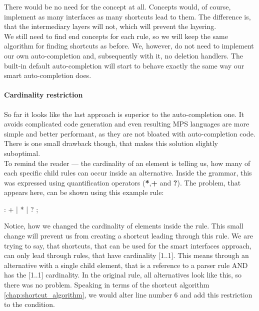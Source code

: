 There would be no need for the  concept at all.
Concepts would, of course, implement as many interfaces as many shortcuts lead to them.
The difference is, that the intermediary layers will not, which will prevent the layering.
\\

We still need to find end concepts for each rule, so we will keep the same algorithm for finding shortcuts as before.
We, however, do not need to implement our own auto-completion and, subsequently with it, no deletion handlers.
The built-in default auto-completion will start to behave exactly the same way our smart auto-completion does.

\paragraph{Cardinality restriction}
\label{chap:cardinality_restriction}

So far it looks like the last approach is superior to the auto-completion one.
It avoids complicated code generation and even resulting MPS languages are more simple and better performant, as they are not bloated with auto-completion code.
There is one small drawback though, that makes this solution slightly suboptimal.
\\

To remind the reader --- the cardinality of an element is telling us, how many of each specific child rules can occur inside an alternative.
Inside the grammar, this was expressed using quantification operators (\textbf{*},\textbf{+} and \textbf{?}).
The problem, that appears here, can be shown using this example rule:

\begin{antlr}
      :   +
             |   *
             |   ?
             ;
\end{antlr}

Notice, how we changed the cardinality of elements inside the  rule.
This small change will prevent us from creating a shortcut leading through this rule.
We are trying to say, that shortcuts, that can be used for the smart interfaces approach, can only lead through rules, that have cardinality [1..1].
This means through an alternative with a single child element, that is a reference to a parser rule AND has the [1..1] cardinality.
In the original  rule, all alternatives look like this, so there was no problem.
Speaking in terms of the shortcut algorithm \ref{chap:shortcut_algorithm}, we would alter line number 6 and add this restriction to the condition.
\\

